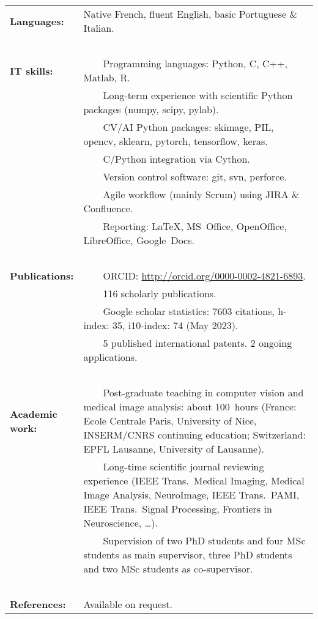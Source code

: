 \documentclass[english,10pt,a4paper]{scrartcl}
\newcommand{\tabitem}{~~\llap{\textbullet}~~}
\begin{document}
\begin{tabular}{p{0.2\linewidth}p{0.8\linewidth}}
  \textbf{Languages:} & Native French, fluent English, basic Portuguese \& Italian.\\
  \ \\
  \textbf{IT skills:} &
  \tabitem Programming languages: Python, C, C++, Matlab, R.\\
  & \tabitem Long-term experience with scientific Python packages (numpy, scipy, pylab).\\
  & \tabitem CV/AI Python packages: skimage, PIL, opencv, sklearn, pytorch, tensorflow, keras.\\
  & \tabitem  C/Python integration via Cython.\\
  & \tabitem Version control software: git, svn, perforce.\\
  & \tabitem Agile workflow (mainly Scrum) using JIRA \& Confluence.\\
  & \tabitem Reporting: \LaTeX, MS~Office, OpenOffice, LibreOffice, Google~Docs.\\
  \ \\
  \textbf{Publications:} &
  \tabitem ORCID: \url{http://orcid.org/0000-0002-4821-6893}. \\
  & \tabitem 116 scholarly publications.\\
  & \tabitem Google scholar statistics: 7603 citations, h-index: 35, i10-index: 74 (May 2023).\\
  & \tabitem 5 published international patents. 2 ongoing applications.\\
  \ \\
  \textbf{Academic work:} & 
  \tabitem Post-graduate teaching in computer vision and medical image analysis: about 100~hours (France: Ecole Centrale Paris, University of Nice, INSERM/CNRS continuing education; Switzerland: EPFL Lausanne, University of Lausanne).\\
  & \tabitem Long-time scientific journal reviewing experience (IEEE Trans.~Medical Imaging, Medical Image Analysis, NeuroImage, IEEE Trans.~PAMI, IEEE Trans.~Signal Processing, Frontiers in Neuroscience, \ldots).\\
  & \tabitem Supervision of two PhD students and four MSc students as main supervisor, three PhD students and two MSc students as co-supervisor.\\
  \ \\
  \textbf{References:} & Available on request.
\end{tabular}



%
\end{document}
